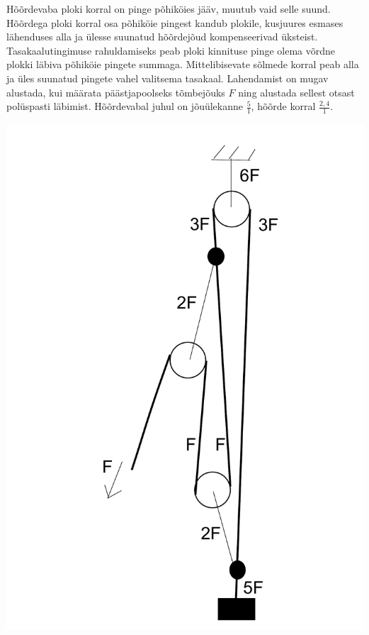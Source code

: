 \documentclass[11pt, twoside]{article}
\begin{document}
{{\ifSolution
Hõõrdevaba ploki korral on pinge põhiköies jääv, muutub vaid selle suund. Hõõrdega ploki korral osa põhiköie pingest kandub plokile, kusjuures esmases lähenduses alla ja ülesse suunatud hõõrdejõud kompenseerivad üksteist. Tasakaalutingimuse rahuldamiseks peab ploki kinnituse pinge olema võrdne plokki läbiva põhiköie pingete summaga. Mittelibisevate sõlmede korral peab alla ja üles suunatud pingete vahel valitsema tasakaal. Lahendamist on mugav alustada, kui määrata päästjapoolseks tõmbejõuks $F$ ning alustada sellest otsast polüspasti läbimist. Hõõrdevabal juhul on jõuülekanne $\frac{5}{1}$, hõõrde korral $\frac{2,4}{1}$.

\begin{center}
\includegraphics[scale=0.25]{2014-v3g-06-PolyspastL1}

\end{center}}}
\end{document}
